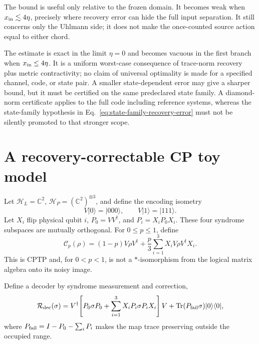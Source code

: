 \documentclass[11pt]{article}
\newcommand{\Tr}{\operatorname{Tr}}
\begin{document}
The bound is useful only relative to the frozen domain.  It becomes weak when
\(x_{\rm in}\lesssim4\eta\), precisely where recovery error can hide the full
input separation.  It still concerns only the Uhlmann side; it does not make
the once-counted source action equal to either chord.

The estimate is exact in the limit \(\eta=0\) and becomes vacuous in the first
branch when \(x_{\rm in}\leq4\eta\).  It is a uniform worst-case consequence of
trace-norm recovery plus metric contractivity; no claim of universal
optimality is made for a specified channel, code, or state pair.  A smaller
state-dependent error may give a sharper bound, but it must be certified on
the same predeclared state family.  A diamond-norm certificate applies to the
full code including reference systems, whereas the state-family hypothesis in
Eq.~\eqref{eq:state-family-recovery-error} must not be silently promoted to
that stronger scope.

\section{A recovery-correctable CP toy model}

Let \(\mathcal H_L=\mathbb C^2\),
\(\mathcal H_P=(\mathbb C^2)^{\otimes3}\), and define the encoding isometry
\begin{equation}
 V|0\rangle=|000\rangle,\qquad V|1\rangle=|111\rangle.
 \label{eq:bitflip-encoding}
\end{equation}
Let \(X_i\) flip physical qubit \(i\), \(P_0=VV^\dagger\), and
\(P_i=X_iP_0X_i\).  These four syndrome subspaces are mutually orthogonal.
For \(0\leq p\leq1\), define
\begin{equation}
 \mathcal C_p(\rho)
 =(1-p)V\rho V^\dagger+\frac{p}{3}\sum_{i=1}^3X_iV\rho V^\dagger X_i.
 \label{eq:bitflip-channel}
\end{equation}
This is CPTP and, for \(0<p<1\), is not a \(*\)-isomorphism from the logical
matrix algebra onto its noisy image.

Define a decoder by syndrome measurement and correction,
\begin{equation}
 \mathcal R_{\rm dec}(\sigma)=
 V^\dagger\!\left[P_0\sigma P_0+
 \sum_{i=1}^3X_iP_i\sigma P_iX_i\right]V
 +\Tr(P_{\rm fail}\sigma)|0\rangle\langle0|,
 \label{eq:bitflip-recovery}
\end{equation}
where \(P_{\rm fail}=I-P_0-\sum_iP_i\) makes the map trace preserving outside
the occupied range.
\end{document}
